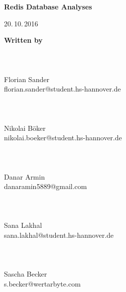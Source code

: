 \documentclass[11pt,DIV12,BCOR0mm,oneside,headings=normal,%
  numbers=noenddot,headsepline,headinclude]{scrreprt}
\begin{document}

\thispagestyle{empty}
{}

\begin{center}
  \vspace*{4\baselineskip}
  {\sffamily\bfseries\LARGE
    Redis Database Analyses\par}
  
  \vspace*{4\baselineskip}
  {\Large }

  \vfill
  {\Large }
  
  \vspace*{4\baselineskip}
  {\Large \par}
  
  \vspace*{4\baselineskip}
  {\Large 20.\,10.\,2016}
  
  \vspace*{4\baselineskip}
\end{center}


{\huge\textbf{Written by}} \\
\\
\\
\textbf{} \\
Florian Sander \\
florian.sander@student.hs-hannover.de \\
\\
\\
\textbf{} \\
Nikolai Böker \\
nikolai.boeker@student.hs-hannover.de \\
\\
\\
\textbf{} \\
Danar Armin \\
danaramin5889@gmail.com \\
\\
\\
\textbf{} \\
Sana Lakhal \\
sana.lakhal@student.hs-hannover.de \\
\\
\\
\textbf{} \\
Sascha Becker \\
s.becker@wertarbyte.com \\
\\
\\
\\
\\


\tableofcontents    %


\newpage
{}




\end{document}
